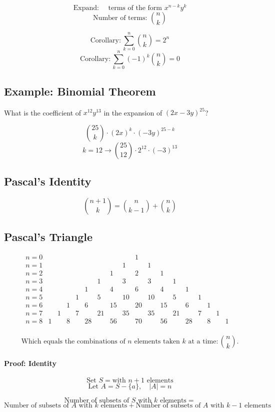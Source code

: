 \documentclass[11pt]{article}
\begin{document}
\[
\text{Expand: } \quad \text{terms of the form } x^{n-k} y^k
\]
\[
\text{Number of terms: } \binom{n}{k}
\]

\[
\text{Corollary}:  \sum_{k=0}^{n} \binom{n}{k} = 2^n
\]
\[
\text{Corollary}:  \sum_{k=0}^{n} (-1)^k \binom{n}{k} = 0
\]

\subsection*{Example: Binomial Theorem}
What is the coefficient of $x^{12} y^{13}$ in the expansion of $(2x - 3y)^{25}$?

\[
\binom{25}{k} \cdot (2x)^{k} \cdot (-3y)^{25-k}
\]
\[
k = 12 \rightarrow \binom{25}{12} \cdot 2^{12} \cdot (-3)^{13}
\]

\subsection{Pascal's Identity}
\[
\binom{n + 1}{k} = \binom{n}{k-1} + \binom{n}{k}
\]

\subsection*{Pascal's Triangle}
\[
\begin{array}{cccccccccccccccccccc}
n=0&&&&&&&&&1&&&&&&&&&\\
n=1&&&&&&&&1&&1&&&&&&&\\
n=2&&&&&&&1&&2&&1&&&&&&\\
n=3&&&&&&1&&3&&3&&1&&&&&\\
n=4&&&&&1&&4&&6&&4&&1&&&&\\
n=5&&&&1&&5&&10&&10&&5&&1&&&\\
n=6&&&1&&6&&15&&20&&15&&6&&1&&\\
n=7&&1&&7&&21&&35&&35&&21&&7&&1&\\
n=8&1&&8&&28&&56&&70&&56&&28&&8&&1\\
\end{array}
\]

\[
\text{Which equals the combinations of $n$ elements taken $k$ at a time}: \binom{n}{k}.
\]

\paragraph{Proof: Identity}

\[
\text{Set } S = \text{with } n + 1 \text{ elements}
\]
\[
\text{Let } A = S - \{a\}, \quad |A| = n
\]

\[
\text{Number of subsets of } S \text{ with } k \text{ elements} = 
\]
\[
\text{Number of subsets of } A \text{ with } k \text{ elements} + \text{Number of subsets of } A \text{ with } k - 1 \text{ elements}
\]
\end{document}
